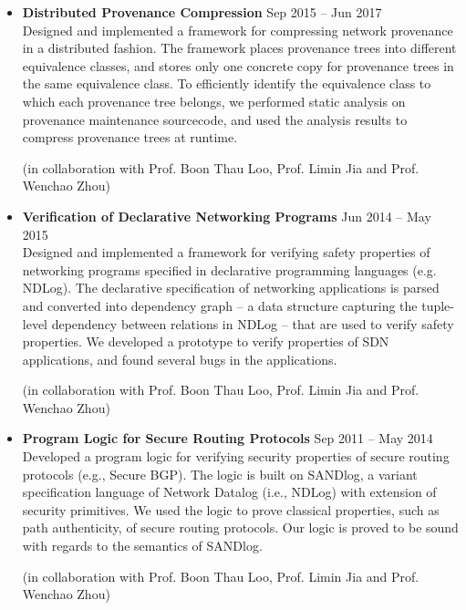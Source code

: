 \begin{itemize}
\item {\bf Distributed Provenance Compression} \hfill Sep 2015 -- Jun
  2017\\ Designed and implemented a framework for compressing network
  provenance in a distributed fashion. The framework places provenance
  trees into different equivalence classes, and stores only one
  concrete copy for provenance trees in the same equivalence class. To
  efficiently identify the equivalence class to which each provenance tree
  belongs, we performed static analysis on provenance maintenance
  sourcecode, and used the analysis results to compress provenance
  trees at runtime.


(in collaboration with Prof. Boon Thau Loo, Prof. Limin Jia and Prof. Wenchao Zhou)
\item {\bf Verification of Declarative Networking Programs} \hfill Jun
  2014 -- May 2015\\ Designed and implemented a framework for
  verifying safety properties of networking programs specified in
  declarative programming languages (e.g. NDLog). The declarative
  specification of networking applications is parsed and converted
  into dependency graph -- a data structure capturing the tuple-level
  dependency between relations in NDLog -- that are used to verify
  safety properties.
  We developed a prototype to verify
  properties of SDN applications, and found several bugs in the
  applications.


(in collaboration with Prof. Boon Thau Loo, Prof. Limin Jia and Prof. Wenchao Zhou)
\item {\bf Program Logic for Secure Routing Protocols} \hfill Sep 2011
  -- May 2014\\ Developed a program logic for verifying security
  properties of secure routing protocols (e.g., Secure BGP). The logic
  is built on SANDlog, a variant specification language of Network
  Datalog (i.e., NDLog) with extension of security primitives. We used
  the logic to prove classical properties, such as path authenticity,
  of secure routing protocols. Our logic is proved to be sound with
  regards to the semantics of SANDlog.


(in collaboration with Prof. Boon Thau Loo, Prof. Limin Jia and Prof. Wenchao Zhou)
\end{itemize}

